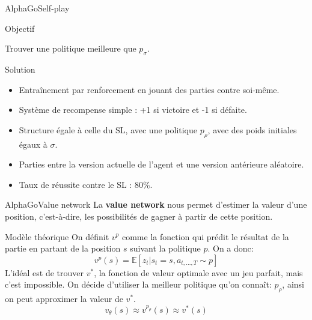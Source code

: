 \begin{frame}{AlphaGo}{Self-play}
    \begin{block}{Objectif}
        \begin{center}
            Trouver une politique meilleure que $p_\sigma$.
        \end{center}
    \end{block}

    \begin{block}{Solution}
        \begin{itemize}
            \item Entraînement par renforcement en jouant des parties contre soi-même.
            \item Système de recompense simple : +1 si victoire et -1 si défaite.
            \item Structure égale à celle du SL, avec une politique $p_\rho$, avec des poids initiales égaux à $\sigma$.
            \item Parties entre la version actuelle de l'agent et une version antérieure aléatoire.
            \item Taux de réussite contre le SL : 80\%.
        \end{itemize}
    \end{block}
\end{frame}


\begin{frame}{AlphaGo}{Value network}
    La \textbf{value network} nous permet d'estimer la valeur d'une position, c'est-à-dire, les possibilités de gagner à partir de cette position.
    \begin{block}{Modèle théorique}
        On définit $v^p$ comme la fonction qui prédit le résultat de la partie en partant de la position $s$ suivant la politique $p$. On a donc: $$v^p(s) = \mathbb{E}[z_t|s_t=s, a_{t,\dots,T}\sim p]$$
        L'idéal est de trouver $v^*$, la fonction de valeur optimale avec un jeu parfait, mais c'est impossible.
        On décide d'utiliser la meilleur politique qu'on connaît: $p_\rho$, ainsi on peut approximer la valeur de $v^*$. $$v_\theta(s) \approx v^{p_\rho}(s) \approx v^*(s)$$
    \end{block}
\end{frame}

